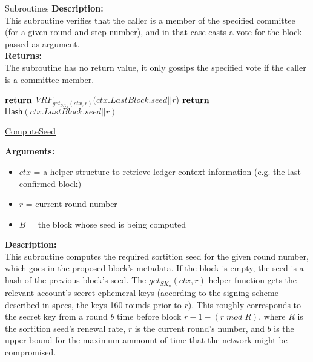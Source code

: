 \documentclass[10pt,a4paper]{article}
\begin{document}
\begin{section}{Subroutines}
\noindent \textbf{Description:}\\
This subroutine verifies that the caller is a member of the specified committee (for a given round and step number), 
and in that case casts a vote for the block passed as argument.\\

\noindent \textbf{Returns:}\\
The subroutine has no return value, it only gossips the specified vote if the caller is a committee member.


\begin{algorithm}[H]
    \begin{algorithmic}[H]
            \State $\Return$ $VRF_{get_{SK_a}(ctx, r)}(ctx.LastBlock.seed||r$)
        \Else
            \State $\Return$ $\mathsf{Hash}(ctx.LastBlock.seed||r)$
        \EndIf
    \EndFunction
    \end{algorithmic}
    \caption{\underline{ComputeSeed}}
\end{algorithm}


\noindent \textbf{Arguments:}
\begin{itemize}
    \item $ctx$ = a helper structure to retrieve ledger context information (e.g. the last confirmed block)
    \item $r$ = current round number
    \item $B$ = the block whose seed is being computed
  \end{itemize}


\noindent \textbf{Description:}\\
This subroutine computes the required sortition seed for the given round number, 
which goes in the proposed block's metadata.
If the block is empty, the seed is a hash of the previous block's seed.
The $get_{SK_a}(ctx, r)$ helper function gets the relevant account's secret ephemeral keys (according to the signing scheme described in specs, the keys 160 rounds prior to $r$).
This roughly corresponds to the secret key from a round $b$ time before block $r-1-(r\;mod\;R)$, where $R$ is the sortition seed's renewal rate, $r$ is the current round's number,
and $b$ is the upper bound for the maximum ammount of time that the network might be compromised.\\


\end{section}
\end{document}
